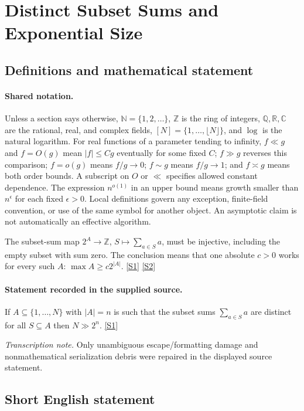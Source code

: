 \documentclass[11pt,a4paper]{article}
\newcommand{\N}{\mathbb{N}}
\newcommand{\Z}{\mathbb{Z}}
\newcommand{\Q}{\mathbb{Q}}
\newcommand{\R}{\mathbb{R}}
\newcommand{\C}{\mathbb{C}}
\newcommand{\sref}[2]{\hyperlink{source:#1:#2}{[S#2]}}
\begin{document}
\section{Distinct Subset Sums and Exponential Size}\label{statement}


\subsection{Definitions and mathematical statement}

\paragraph{Shared notation.}Unless a section says otherwise, $\N=\{1,2,\ldots\}$,
$\Z$ is the ring of integers, $\Q,\R,\C$ are the rational, real, and complex
fields, $[N]=\{1,\ldots,\lfloor N\rfloor\}$, and $\log$ is the natural
logarithm. For real functions of a parameter tending to infinity,
$f\ll g$ and $f=O(g)$ mean $|f|\leq Cg$ eventually for some fixed $C$;
$f\gg g$ reverses this comparison; $f=o(g)$ means $f/g\to0$;
$f\sim g$ means $f/g\to1$; and $f\asymp g$ means both order bounds.
A subscript on $O$ or $\ll$ specifies allowed constant dependence.
The expression $n^{o(1)}$ in an upper bound means growth smaller than
$n^\epsilon$ for each fixed $\epsilon>0$. Local definitions govern any
exception, finite-field convention, or use of the same symbol for another
object. An asymptotic claim is not automatically an effective algorithm.



The subset-sum map $2^A\to\Z$, $S\mapsto\sum_{a\in S}a$, must be injective, including the empty subset with sum zero. The conclusion means that one absolute $c>0$ works for every such $A$: $\max A\geq c2^{|A|}$. \sref{statement}{1} \sref{statement}{2}

\paragraph{Statement recorded in the supplied source.}
If $A\subseteq \{1,\ldots,N\}$ with $\lvert A\rvert=n$ is such that the subset sums $\sum_{a\in S}a$ are distinct for all $S\subseteq A$ then $ N \gg 2^{n}. $ \sref{statement}{1}

{\small\emph{Transcription note.} Only unambiguous escape/formatting damage and nonmathematical serialization debris were repaired in the displayed source statement.}

\subsection{Short English statement}
\end{document}

